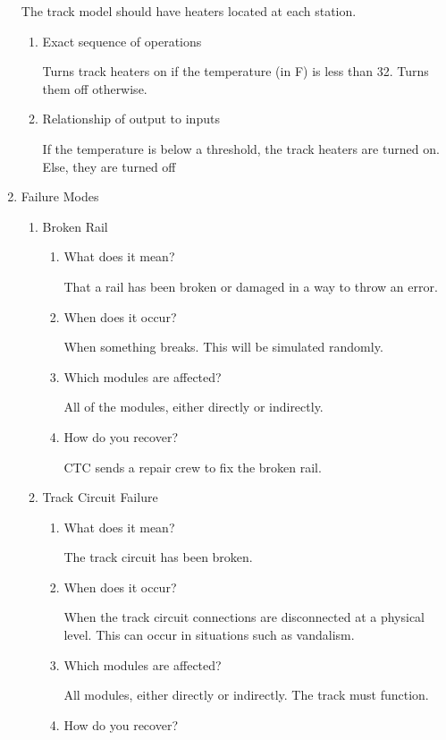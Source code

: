 \documentclass[11pt]{article}
\begin{document}
\begin{enumerate}
The track model should have heaters located at each station.
\begin{enumerate}
\item Exact sequence of operations
\label{sec-3-1-3-9-1}

Turns track heaters on if the temperature (in F) is less than 32. Turns them off otherwise.
\item Relationship of output to inputs
\label{sec-3-1-3-9-2}

If the temperature is below a threshold, the track heaters are turned on. Else, they are turned off
\end{enumerate}
\item Failure Modes
\label{sec-3-1-3-10}
\begin{enumerate}
\item Broken Rail
\label{sec-3-1-3-10-1}
\begin{enumerate}
\item What does it mean?
\label{sec-3-1-3-10-1-1}

That a rail has been broken or damaged in a way to throw an error.
\item When does it occur?
\label{sec-3-1-3-10-1-2}

When something breaks. This will be simulated randomly.
\item Which modules are affected?
\label{sec-3-1-3-10-1-3}

All of the modules, either directly or indirectly.
\item How do you recover?
\label{sec-3-1-3-10-1-4}

CTC sends a repair crew to fix the broken rail.
\end{enumerate}
\item Track Circuit Failure
\label{sec-3-1-3-10-2}
\begin{enumerate}
\item What does it mean?
\label{sec-3-1-3-10-2-1}

The track circuit has been broken.
\item When does it occur?
\label{sec-3-1-3-10-2-2}

When the track circuit connections are disconnected at a physical level. This can occur in situations such as vandalism.
\item Which modules are affected?
\label{sec-3-1-3-10-2-3}

All modules, either directly or indirectly. The track must function.
\item How do you recover?
\label{sec-3-1-3-10-2-4}


\end{enumerate}
\end{enumerate}
\end{enumerate}
\end{document}
